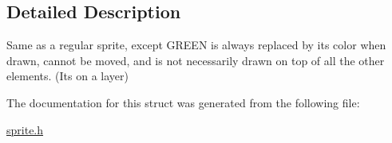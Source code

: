 \subsection{Detailed Description}
Same as a regular sprite, except G\+R\+E\+EN is always replaced by its color when drawn, cannot be moved, and is not necessarily drawn on top of all the other elements. (It\textquotesingle{}s on a layer) 

The documentation for this struct was generated from the following file\+:\begin{DoxyCompactItemize}
\item 
\mbox{\hyperlink{sprite_8h}{sprite.\+h}}\end{DoxyCompactItemize}
